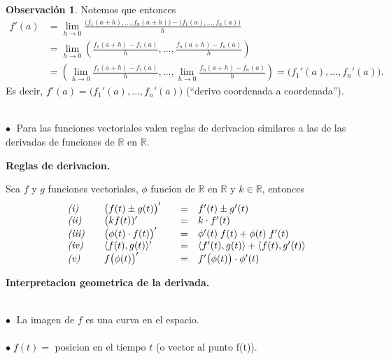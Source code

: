 \documentclass{article}
\theoremstyle{definition}
\theoremstyle{definition}
\newtheorem*{obs}{Observación}
\theoremstyle{remark}
\newcommand\bl{$\bullet\;$}
\begin{document}
\begin{obs}
  Notemos que entonces \[ 
    \begin{aligned}
      f'(a) &= \lim_{h \to 0}{\frac{\big(f_1(a+h), \dots ,f_n(a+h)\big)-\big(f_1(a), \dots , f_n(a)\big)}{h}} \\
            &= \lim_{h \to 0}{\left(\frac{f_1(a+h)-f_1(a)}{h}, \dots , \frac{f_n(a+h)-f_n(a)}{h}\right)} \\
            &= \left(\lim_{h \to 0}{\frac{f_1(a+h)-f_1(a)}{h}}, \dots, \lim_{h \to 0}{\frac{f_n(a+h)-f_n(a)}{h}}\right)=\big(f_1'(a), \dots ,f_n'(a)\big).
    \end{aligned}
  \] Es decir, $f'(a)=\big(f_1'(a), \dots ,f_n'(a)\big)$ \quad \big(``derivo coordenada a coordenada''\big).
\end{obs}\; \\
 \textcolor{rojop2}{\bl} Para las funciones vectoriales valen reglas de derivacion similares a las de las derivadas de funciones de $\mathbb{R}$ en $\mathbb{R}$.
\begin{center}
\textbf{Reglas de derivacion.}
\end{center}
Sea $f$ y $g$ funciones vectoriales, $\phi$ funcion de $\mathbb{R}$ en $\mathbb{R}$ y $k \in \mathbb{R}$, entonces \[
  \begin{array}{lllllll}
 & \emph{(i)} & & \big(f(t) \pm g(t) \big)' &&=& f'(t)\pm g'(t)\\ 
 & \emph{(ii)} & & \big(k f(t))' &&=& k \cdot f'(t) \\
 & \emph{(iii)} & & \big(\phi(t)\cdot f(t)\big)' &&=& \phi'(t) \; f(t) + \phi(t) \; f'(t) \\
 & \emph{(iv)} & & \langle f(t),g(t) \rangle' &&=& \langle f'(t),g(t)\rangle + \langle f(t), g'(t) \rangle \\ 
 & \emph{(v)} & & f\big(\phi(t)\big)' &&= & f'\big(\phi(t)\big) \cdot \phi'(t)
\end{array}
\]
 \begin{center}
\textbf{Interpretacion geometrica de la derivada.}
\end{center}
\begin{figure}[h]
\centering
\def\svgwidth{1\textwidth}

\end{figure}
\; \\ 
\textcolor{rojop2}{\bl} La imagen de $f$ es una curva en el espacio. \\\\
\quad \bl $f(t) =$ posicion en el tiempo $t$ \big(o vector al punto f(t)\big). \\\\
\end{document}
